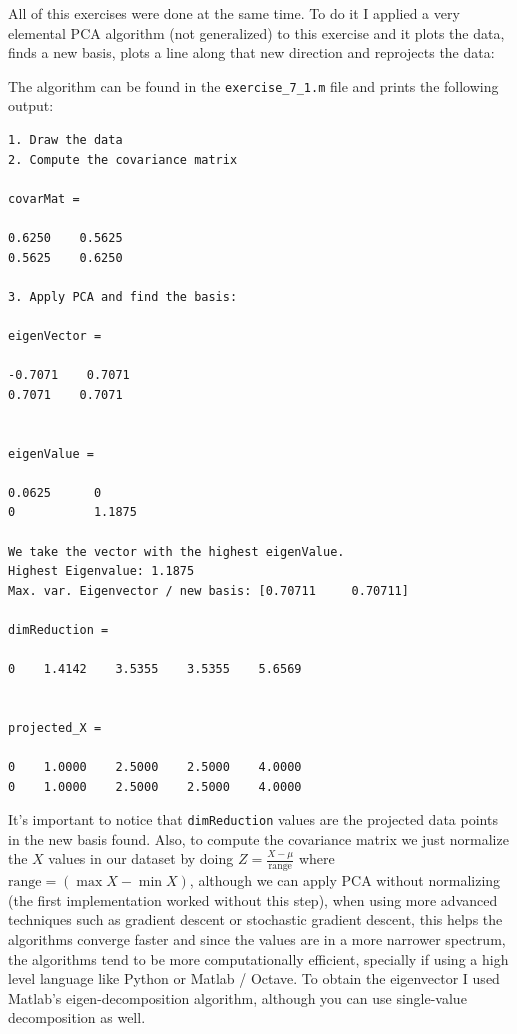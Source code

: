 \documentclass[]{article}
\begin{document}
All of this exercises were done at the same time. To do it I applied a very elemental PCA algorithm (not generalized) to this exercise and it plots the data, finds a new basis, plots a line along that new direction and reprojects the data:

The algorithm can be found in the \texttt{exercise\_7\_1.m} file and prints the following output:

\begin{verbatim}
1. Draw the data
2. Compute the covariance matrix

covarMat =

0.6250    0.5625
0.5625    0.6250

3. Apply PCA and find the basis:

eigenVector =

-0.7071    0.7071
0.7071    0.7071


eigenValue =

0.0625  	0
0    		1.1875

We take the vector with the highest eigenValue.
Highest Eigenvalue: 1.1875
Max. var. Eigenvector / new basis: [0.70711     0.70711]

dimReduction =

0    1.4142    3.5355    3.5355    5.6569


projected_X =

0    1.0000    2.5000    2.5000    4.0000
0    1.0000    2.5000    2.5000    4.0000
\end{verbatim}

It's important to notice that \texttt{dimReduction} values are the projected data points in the new basis found. Also, to compute the covariance matrix we just normalize the $X$ values in our dataset by doing $Z = \frac{X - \mu}{\text{range}}$ where $\text{range} = \left(\max{X} - \min{X}\right)$, although we can apply PCA without normalizing (the first implementation worked without this step), when using more advanced techniques such as gradient descent or stochastic gradient descent, this helps the algorithms converge faster and since the values are in a more narrower spectrum, the algorithms tend to be more computationally efficient, specially if using a high level language like Python or Matlab / Octave. To obtain the eigenvector I used Matlab's eigen-decomposition algorithm, although you can use single-value decomposition as well.
\end{document}
